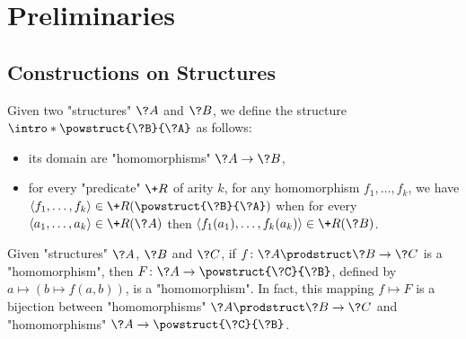 \section{\AP\label{sec:dichotomy-preliminaries}%
	Preliminaries}

\subsection{Constructions on Structures}

Given two "structures" $\?A$ and $\?B$, we define the structure \AP$\intro*\powstruct{\?B}{\?A}$ as follows:
\begin{itemize}
  \item its domain are "homomorphisms" $\?A \to \?B$,
  \item for every "predicate" $\+R$ of arity $k$, for any homomorphism $f_1,\hdots,f_k$,
  we have $\langle f_1,\hdots,f_k\rangle \in \+R(\powstruct{\?B}{\?A})$ when for every
  $\langle a_1,\hdots,a_k\rangle \in \+R(\?A)$
  then $\langle f_1(a_1), \hdots, f_k(a_k) \rangle \in \+R(\?B)$.
\end{itemize}


\begin{proposition}
	\AP\label{prop:currying-hom}
	Given "structures" $\?A$, $\?B$ and $\?C$, if $f\colon \?A\prodstruct \?B \to \?C$
	is a "homomorphism", then $F\colon \?A \to \powstruct{\?C}{\?B}$,
	defined by $a \mapsto (b \mapsto f(a,b))$, is a "homomorphism".
	In fact, this mapping $f \mapsto F$ is a bijection
	between "homomorphisms" $\?A\prodstruct \?B \to \?C$
	and "homomorphisms" $\?A \to \powstruct{\?C}{\?B}$.
\end{proposition}

